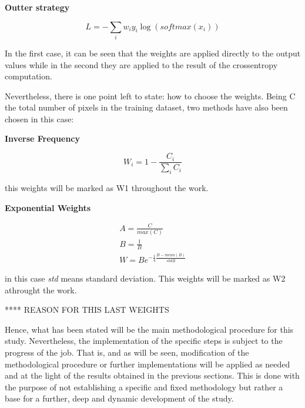 \documentclass[12pt,a4paper]{article}
\begin{document}
\textbf{Outter strategy}\newline

\begin{equation*}
L = -\sum_{i}  w_{i}y_{i}\log(softmax(x_{i}))
\end{equation*}


In the first case, it can be seen that the weights are applied directly to the output values while in the second they are applied to the result of the crossentropy computation.\newline

Nevertheless, there  is one point left to state: how to choose the weights. Being C the total number of pixels in the training dataset, two methods have also been chosen in this case:\newline

\textbf{Inverse Frequency}\newline

\begin{equation*}
W_{i} = 1-\frac{C_{i}}{\sum_{i}C_{i}}
\end{equation*}

this weights will be marked as W1 throughout the work.\newline

\textbf{Exponential Weights}\newline

\begin{eqnarray*}
A = \frac{C}{max(C)}\\
B = \frac{1}{B}\\
W = B e^{-\frac{1}{4}\frac{B-mean(B)}{std{B}}} 
\end{eqnarray*}

in this case \textit{std} means standard deviation. This weights will be marked as W2 athrought the work.\newline

**** REASON FOR THIS LAST WEIGHTS

Hence, what has been stated will be the main methodological procedure for this study. Nevertheless, the implementation of the specific steps is subject to the progress of the job. That is, and as will be seen, modification of the methodological procedure or further implementations will be applied as needed and at the light of the results obtained in the previous sections. This is done with the purpose of not establishing a specific and fixed methodology but rather a base for a further, deep and dynamic development of the study. \newline
\end{document}
